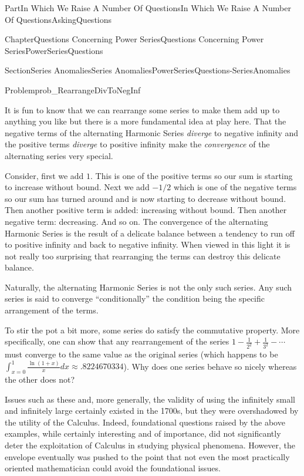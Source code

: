 \documentclass[oneside,10pt,]{book}
\numberwithin{equation}{part}
\begin{document}
\begin{partptx}{Part}{In Which We Raise A Number Of Questions}{}{In Which We Raise A Number Of Questions}{}{}{AskingQuestions}
\begin{chapterptx}{Chapter}{Questions Concerning Power Series}{}{Questions Concerning Power Series}{}{}{PowerSeriesQuestions}
\begin{sectionptx}{Section}{Series Anomalies}{}{Series Anomalies}{}{}{PowerSeriesQuestions-SeriesAnomalies}
\begin{problem}{Problem}{}{prob_RearrangeDivToNegInf}
\end{problem}
It is fun to know that we can rearrange some series to make them add up to anything you like but there is a more fundamental idea at play here. That the negative terms of the alternating Harmonic Series \emph{diverge} to negative infinity and the positive terms \emph{diverge} to positive infinity make the \emph{convergence} of the alternating series very special.%
\par
Consider, first we add \(1\). This is one of the positive terms so our sum is starting to increase without bound. Next we add \(-1/2\) which is one of the negative terms so our sum has turned around and is now starting to decrease without bound. Then another positive term is added: increasing without bound. Then another negative term: decreasing. And so on. The convergence of the alternating Harmonic Series is the result of a delicate balance between a tendency to run off to positive infinity and back to negative infinity. When viewed in this light it is not really too surprising that rearranging the terms can destroy this delicate balance.%
\par
Naturally, the alternating Harmonic Series is not the only such series. Any such series is said to converge ``conditionally'' \textemdash{} the condition being the specific arrangement of the terms.%
\par
To stir the pot a bit more, some series do satisfy the commutative property. More specifically, one can show that any rearrangement of the series \(1-\frac{1}{2^2}+\frac{1}{3^2}-\cdots\) must converge to the same value as the original series (which happens to be \(\int_{x=0}^1\frac{\text{ ln } (1+x)}{x}dx\approx.8224670334\)). Why does one series behave so nicely whereas the other does not?%
\par
Issues such as these and, more generally, the validity of using the infinitely small and infinitely large certainly existed in the 1700s, but they were overshadowed by the utility of the Calculus. Indeed, foundational questions raised by the above examples, while certainly interesting and of importance, did not significantly deter the exploitation of Calculus in studying physical phenomena. However, the envelope eventually was pushed to the point that not even the most practically oriented mathematician could avoid the foundational issues.%
\end{sectionptx}
%
%
\typeout{************************************************}
\typeout{************************************************}

\end{chapterptx}
\end{partptx}
\end{document}
